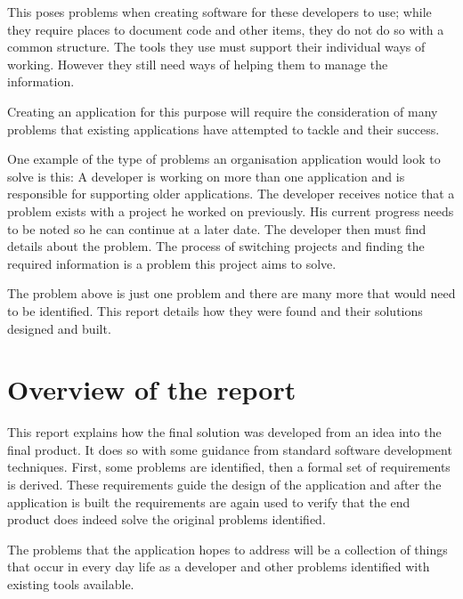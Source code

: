 This poses problems when creating software for these developers to use; while
they require places to document code and other items, they do not do so with a
common structure. The tools they use must support their individual ways of
working. However they still need ways of helping them to manage the
information.

Creating an application for this purpose will require the consideration of many
problems that existing applications have attempted to tackle and their success.

One example of the type of problems an organisation application would look to
solve is this: A developer is working on more than one application and is
responsible for supporting older applications. The developer receives notice
that a problem exists with a project he worked on previously. His current
progress needs to be noted so he can continue at a later date. The developer
then must find details about the problem. The process of switching projects and
finding the required information is a problem this project aims to solve.

The problem above is just one problem and there are many more that would need to
be identified. This report details how they were found and their solutions
designed and built.

\section{Overview of the report}\label{overview-of-the-report}

This report explains how the final solution was developed from an idea
into the final product. It does so with some guidance from standard
software development techniques. First, some problems are identified, then
a formal set of requirements is derived. These requirements guide the
design of the application and after the application is built the
requirements are again used to verify that the end product does indeed
solve the original problems identified.

The problems that the application hopes to address will be a collection
of things that occur in every day life as a developer and other problems
identified with existing tools available.
